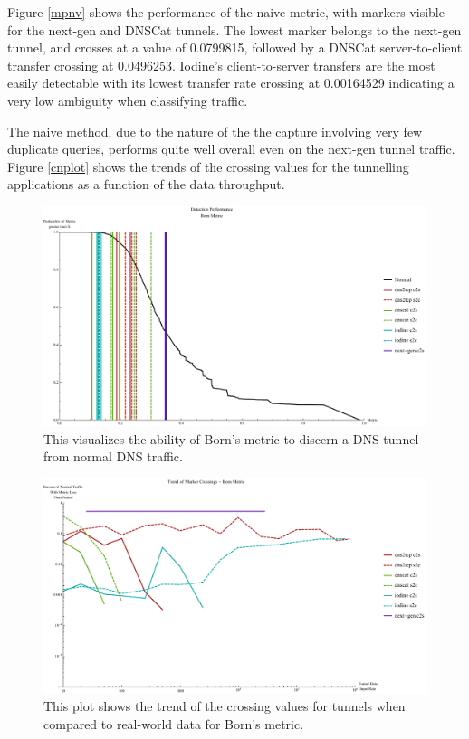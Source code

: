 \documentclass[12pt]{report}
\theoremstyle{remark}
\theoremstyle{definition}
\theoremstyle{definition}
\theoremstyle{definition}
\begin{document}
Figure \ref{mpnv} shows the performance of the naive metric, with markers
visible for the next-gen and DNSCat tunnels. The lowest marker belongs to the
next-gen tunnel, and crosses at a value of 0.0799815, followed by a DNSCat
server-to-client transfer crossing at 0.0496253. Iodine's client-to-server
transfers are the most easily detectable with its lowest transfer rate crossing
at 0.00164529 indicating a very low ambiguity when classifying traffic.

The naive method, due to the nature of the the capture involving very few
duplicate queries, performs quite well overall even on the next-gen tunnel
traffic. Figure \ref{cnplot} shows the trends of the crossing values for the
tunnelling applications as a function of the data throughput.

\begin{figure}
\centering
\includegraphics[width=\textwidth]{figures/mpbv.pdf}
\caption[Tunnel Detection Performance - Born's Metric]{This visualizes the
ability of Born's metric to discern a DNS tunnel from normal DNS traffic.}
\label{mpbv}
\end{figure}

\begin{figure}
\centering
\includegraphics[width=\textwidth]{figures/cbplot.pdf}
\caption[Trend of Crossing Value for Tunnels - Born's Metric]{This plot shows
the trend of the crossing values for tunnels when compared to real-world data 
for Born's metric.}
\label{cbplot}
\end{figure}
\end{document}
